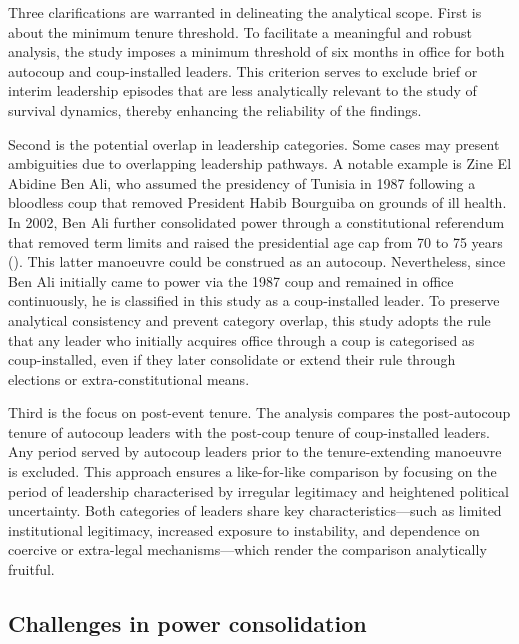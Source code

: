 \documentclass[
  12pt,
]{report}
\begin{document}
Three clarifications are warranted in delineating the analytical scope.
First is about the minimum tenure threshold. To facilitate a meaningful
and robust analysis, the study imposes a minimum threshold of six months
in office for both autocoup and coup-installed leaders. This criterion
serves to exclude brief or interim leadership episodes that are less
analytically relevant to the study of survival dynamics, thereby
enhancing the reliability of the findings.

Second is the potential overlap in leadership categories. Some cases may
present ambiguities due to overlapping leadership pathways. A notable
example is Zine El Abidine Ben Ali, who assumed the presidency of
Tunisia in 1987 following a bloodless coup that removed President Habib
Bourguiba on grounds of ill health. In 2002, Ben Ali further
consolidated power through a constitutional referendum that removed term
limits and raised the presidential age cap from 70 to 75 years
(). This latter
manoeuvre could be construed as an autocoup. Nevertheless, since Ben Ali
initially came to power via the 1987 coup and remained in office
continuously, he is classified in this study as a coup-installed leader.
To preserve analytical consistency and prevent category overlap, this
study adopts the rule that any leader who initially acquires office
through a coup is categorised as coup-installed, even if they later
consolidate or extend their rule through elections or
extra-constitutional means.

Third is the focus on post-event tenure. The analysis compares the
post-autocoup tenure of autocoup leaders with the post-coup tenure of
coup-installed leaders. Any period served by autocoup leaders prior to
the tenure-extending manoeuvre is excluded. This approach ensures a
like-for-like comparison by focusing on the period of leadership
characterised by irregular legitimacy and heightened political
uncertainty. Both categories of leaders share key characteristics---such
as limited institutional legitimacy, increased exposure to instability,
and dependence on coercive or extra-legal mechanisms---which render the
comparison analytically fruitful.

\subsection*{Challenges in power
consolidation}\label{challenges-in-power-consolidation}
\end{document}
